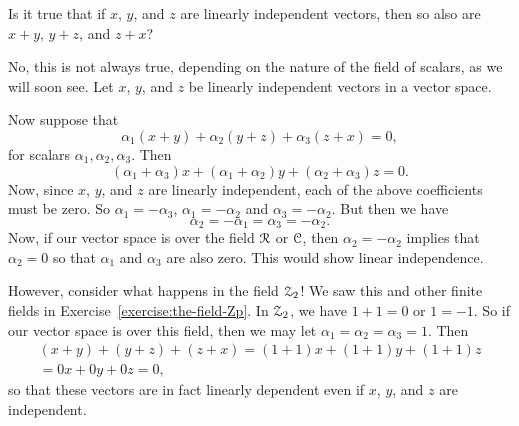  Is it true that if $x$, $y$, and $z$ are linearly
independent vectors, then so also are $x + y$, $y + z$, and $z + x$?
\begin{solution}
  No, this is not always true, depending on the nature of the field of
  scalars, as we will soon see. Let $x$, $y$, and $z$ be linearly
  independent vectors in a vector space.

  Now suppose that
  \begin{equation*}
    \alpha_1(x + y) + \alpha_2(y + z) + \alpha_3(z + x) = 0,
  \end{equation*}
  for scalars $\alpha_1,\alpha_2,\alpha_3$. Then
  \begin{equation*}
    (\alpha_1 + \alpha_3)x + (\alpha_1 + \alpha_2)y
    + (\alpha_2 + \alpha_3)z = 0.
  \end{equation*}
  Now, since $x$, $y$, and $z$ are linearly independent, each of the
  above coefficients must be zero. So $\alpha_1 = -\alpha_3$,
  $\alpha_1 = -\alpha_2$ and $\alpha_3 = -\alpha_2$. But then we have
  \begin{equation*}
    \alpha_2 = -\alpha_1 = \alpha_3 = -\alpha_2.
  \end{equation*}
  Now, if our vector space is over the field $\mathcal{R}$ or $\mathcal{C}$, then
  $\alpha_2 = -\alpha_2$ implies that $\alpha_2 = 0$ so that
  $\alpha_1$ and $\alpha_3$ are also zero. This would show linear
  independence.

  However, consider what happens in the field $\mathcal{Z}_2$! We saw this and
  other finite fields in Exercise~\ref{exercise:the-field-Zp}. In
  $\mathcal{Z}_2$, we have $1 + 1 = 0$ or $1 = -1$. So if our vector space is
  over this field, then we may let
  $\alpha_1 = \alpha_2 = \alpha_3 = 1$. Then
  \begin{multline*}
    (x + y) + (y + z) + (z + x) = (1 + 1)x + (1 + 1)y + (1 + 1)z \\
    = 0x + 0y + 0z = 0,
  \end{multline*}
  so that these vectors are in fact linearly dependent even if $x$,
  $y$, and $z$ are independent.
\end{solution}

